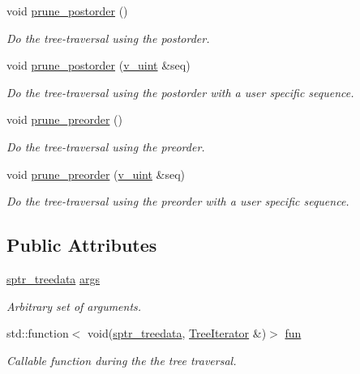 \begin{DoxyCompactItemize}
\item 
void \hyperlink{classpruner_1_1Tree_a7d465880d18acf79f3a772ea5412b0d7}{prune\+\_\+postorder} ()
\begin{DoxyCompactList}\small\item\em Do the tree-\/traversal using the postorder. \end{DoxyCompactList}\item 
void \hyperlink{classpruner_1_1Tree_a8318027f3d2b1a07bf25e813c7c80056}{prune\+\_\+postorder} (\hyperlink{namespacepruner_af0145646bd7ede012cd336b416bc5579}{v\+\_\+uint} \&seq)
\begin{DoxyCompactList}\small\item\em Do the tree-\/traversal using the postorder with a user specific sequence. \end{DoxyCompactList}\item 
void \hyperlink{classpruner_1_1Tree_ac85bfb083b3856e65987e1d15885a61c}{prune\+\_\+preorder} ()
\begin{DoxyCompactList}\small\item\em Do the tree-\/traversal using the preorder. \end{DoxyCompactList}\item 
void \hyperlink{classpruner_1_1Tree_a6841109c7ff37bcabdf3a4d79009ad21}{prune\+\_\+preorder} (\hyperlink{namespacepruner_af0145646bd7ede012cd336b416bc5579}{v\+\_\+uint} \&seq)
\begin{DoxyCompactList}\small\item\em Do the tree-\/traversal using the preorder with a user specific sequence. \end{DoxyCompactList}\end{DoxyCompactItemize}
\subsection*{Public Attributes}
\begin{DoxyCompactItemize}
\item 
\hyperlink{namespacepruner_a533476fef17527e75c4fba71d8c4ce50}{sptr\+\_\+treedata} \hyperlink{classpruner_1_1Tree_ac61a4133ceae4ea3473ea84df94f0931}{args}\hypertarget{classpruner_1_1Tree_ac61a4133ceae4ea3473ea84df94f0931}{}\label{classpruner_1_1Tree_ac61a4133ceae4ea3473ea84df94f0931}

\begin{DoxyCompactList}\small\item\em Arbitrary set of arguments. \end{DoxyCompactList}\item 
std\+::function$<$ void(\hyperlink{namespacepruner_a533476fef17527e75c4fba71d8c4ce50}{sptr\+\_\+treedata}, \hyperlink{classpruner_1_1TreeIterator}{Tree\+Iterator} \&)$>$ \hyperlink{classpruner_1_1Tree_a095f59358c914fb66939d2d82ca3ebc4}{fun}
\begin{DoxyCompactList}\small\item\em Callable function during the the tree traversal. \end{DoxyCompactList}\end{DoxyCompactItemize}
